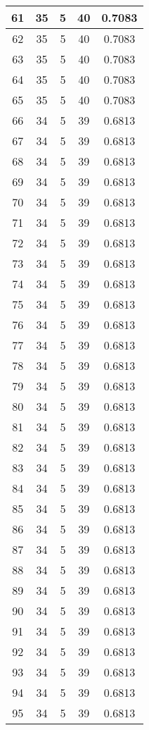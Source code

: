 \documentclass[letterpaper, 12pt]{article}
\begin{document}
\begin{longtable}{|c|c|c|c|c|}
61 & 35 & 5 & 40 & 0.7083 \\
\hline
62 & 35 & 5 & 40 & 0.7083 \\
\hline
63 & 35 & 5 & 40 & 0.7083 \\
\hline
64 & 35 & 5 & 40 & 0.7083 \\
\hline
65 & 35 & 5 & 40 & 0.7083 \\
\hline
66 & 34 & 5 & 39 & 0.6813 \\
\hline
67 & 34 & 5 & 39 & 0.6813 \\
\hline
68 & 34 & 5 & 39 & 0.6813 \\
\hline
69 & 34 & 5 & 39 & 0.6813 \\
\hline
70 & 34 & 5 & 39 & 0.6813 \\
\hline
71 & 34 & 5 & 39 & 0.6813 \\
\hline
72 & 34 & 5 & 39 & 0.6813 \\
\hline
73 & 34 & 5 & 39 & 0.6813 \\
\hline
74 & 34 & 5 & 39 & 0.6813 \\
\hline
75 & 34 & 5 & 39 & 0.6813 \\
\hline
76 & 34 & 5 & 39 & 0.6813 \\
\hline
77 & 34 & 5 & 39 & 0.6813 \\
\hline
78 & 34 & 5 & 39 & 0.6813 \\
\hline
79 & 34 & 5 & 39 & 0.6813 \\
\hline
80 & 34 & 5 & 39 & 0.6813 \\
\hline
81 & 34 & 5 & 39 & 0.6813 \\
\hline
82 & 34 & 5 & 39 & 0.6813 \\
\hline
83 & 34 & 5 & 39 & 0.6813 \\
\hline
84 & 34 & 5 & 39 & 0.6813 \\
\hline
85 & 34 & 5 & 39 & 0.6813 \\
\hline
86 & 34 & 5 & 39 & 0.6813 \\
\hline
87 & 34 & 5 & 39 & 0.6813 \\
\hline
88 & 34 & 5 & 39 & 0.6813 \\
\hline
89 & 34 & 5 & 39 & 0.6813 \\
\hline
90 & 34 & 5 & 39 & 0.6813 \\
\hline
91 & 34 & 5 & 39 & 0.6813 \\
\hline
92 & 34 & 5 & 39 & 0.6813 \\
\hline
93 & 34 & 5 & 39 & 0.6813 \\
\hline
94 & 34 & 5 & 39 & 0.6813 \\
\hline
95 & 34 & 5 & 39 & 0.6813 \\

\end{longtable}
\end{document}
